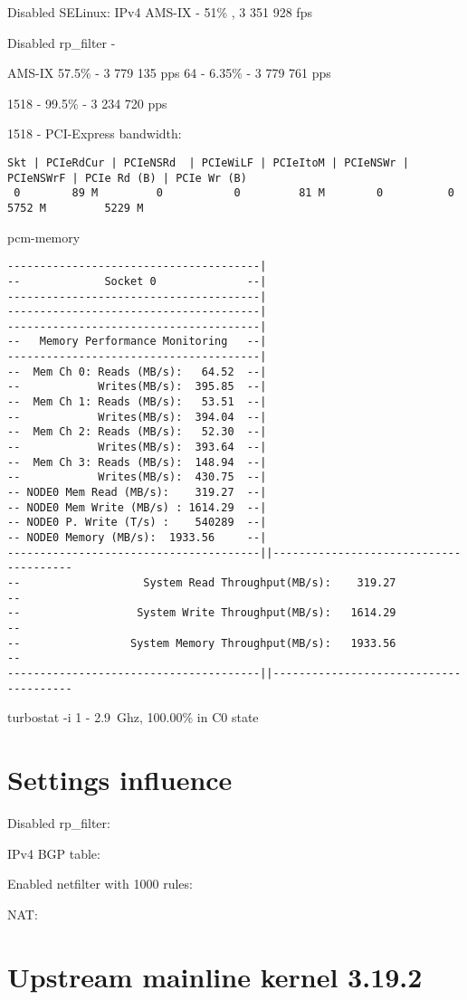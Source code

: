 Disabled SELinux:
IPv4 AMS-IX - 51\% , 3 351 928 fps

Disabled rp\_filter -

AMS-IX 57.5\% - 3 779 135 pps
64 - 6.35\% - 3 779 761 pps

1518 - 99.5\% - 3 234 720 pps

1518 - PCI-Express bandwidth:
\begin{lstlisting}
Skt | PCIeRdCur | PCIeNSRd  | PCIeWiLF | PCIeItoM | PCIeNSWr | PCIeNSWrF | PCIe Rd (B) | PCIe Wr (B)
 0        89 M         0           0         81 M        0          0          5752 M         5229 M
\end{lstlisting}

pcm-memory
\begin{lstlisting}
---------------------------------------|
--             Socket 0              --|
---------------------------------------|
---------------------------------------|
---------------------------------------|
--   Memory Performance Monitoring   --|
---------------------------------------|
--  Mem Ch 0: Reads (MB/s):   64.52  --|
--            Writes(MB/s):  395.85  --|
--  Mem Ch 1: Reads (MB/s):   53.51  --|
--            Writes(MB/s):  394.04  --|
--  Mem Ch 2: Reads (MB/s):   52.30  --|
--            Writes(MB/s):  393.64  --|
--  Mem Ch 3: Reads (MB/s):  148.94  --|
--            Writes(MB/s):  430.75  --|
-- NODE0 Mem Read (MB/s):    319.27  --|
-- NODE0 Mem Write (MB/s) : 1614.29  --|
-- NODE0 P. Write (T/s) :    540289  --|
-- NODE0 Memory (MB/s):  1933.56     --|
---------------------------------------||---------------------------------------
--                   System Read Throughput(MB/s):    319.27                  --
--                  System Write Throughput(MB/s):   1614.29                  --
--                 System Memory Throughput(MB/s):   1933.56                  --
---------------------------------------||---------------------------------------
\end{lstlisting}
turbostat -i 1 - 2.9~Ghz, 100.00\% in C0 state


\section{Settings influence}
Disabled rp\_filter:

IPv4 BGP table:

Enabled netfilter with 1000 rules:

NAT:




\section{Upstream mainline kernel 3.19.2}

